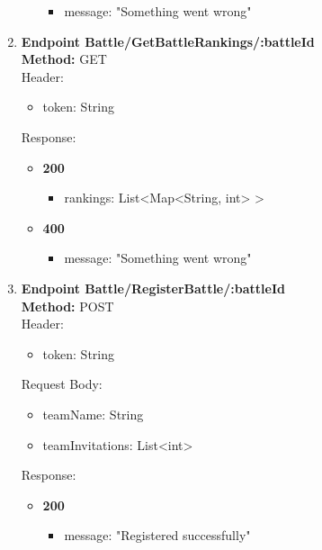 \begin{enumerate}
\begin{itemize}
\begin{itemize}
            \item message: "Something went wrong"
        \end{itemize}
    \end{itemize}
    \item \textbf{Endpoint Battle/GetBattleRankings/:battleId} \\
    \textbf{Method:} GET \\
    Header:\\
    \begin{itemize}
        \item token: String
    \end{itemize}
    Response:\\
    \begin{itemize}
        \item \textbf{200} \\
        \begin{itemize}
            \item rankings: List<Map<String, int> >
        \end{itemize}
        \item \textbf{400} \\
        \begin{itemize}
            \item message: "Something went wrong"
        \end{itemize}
    \end{itemize}
    \item \textbf{Endpoint Battle/RegisterBattle/:battleId} \\
    \textbf{Method:} POST \\
    Header:\\
    \begin{itemize}
        \item token: String
    \end{itemize}
    Request Body:\\
    \begin{itemize}
        \item teamName: String
        \item teamInvitations: List<int>
    \end{itemize}
    Response:\\
    \begin{itemize}
        \item \textbf{200} \\
        \begin{itemize}
            \item message: "Registered successfully"

\end{itemize}
\end{itemize}
\end{enumerate}

